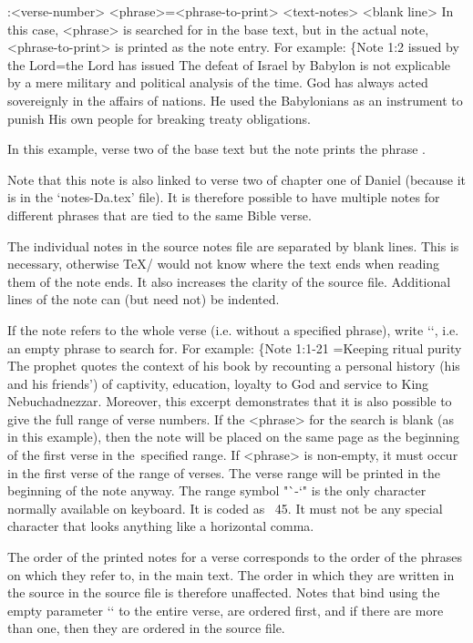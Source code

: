 {{{{{\begtt
{}:<verse-number> {<phrase>}={<phrase-to-print>} <text-notes>
<blank line>
\endtt
In this case, <phrase> is searched for in the base text, but in the actual
note, <phrase-to-print> is printed as the note entry. For example:
\begtt
\{Note 1:2 {issued by the Lord}={the Lord has issued} The defeat of Israel by Babylon is not explicable
   by a mere military and political analysis of the time. God has always acted sovereignly 
   in the affairs of nations. He used the Babylonians as an instrument to punish His own
   people for breaking treaty obligations.

\endtt
In this example, verse two of the base text  
but the note prints the phrase .

Note that this note is also linked to verse two of chapter one
of Daniel (because it is in the `notes-Da.tex' file). It is therefore possible to have multiple
notes for different phrases that are tied to the same Bible verse. 

The individual notes in the source notes file are separated by blank
lines. This is necessary, otherwise \TeX/ would not know where the text ends when reading them
of the note ends. It also increases the clarity of the source file. Additional lines
of the note can (but need not) be indented. 


If the note refers to the whole verse (i.e. without a specified phrase), write
`{}`, i.e. an empty phrase to search for. For example:
\begtt
\{Note 1:1-21 {}={Keeping ritual purity} The prophet quotes the context of his book
   by recounting a personal history (his and his friends') of captivity, education, loyalty to God
   and service to King Nebuchadnezzar.
\endtt
Moreover, this excerpt demonstrates that it is also possible to give the full range of verse numbers.
If the <phrase> for the search is blank (as in this example), then the note
will be placed on the same page as the beginning of the first verse in the~specified range.
If <phrase> is non-empty, it must occur in the first verse of the
range of verses. The verse range will be printed in the beginning of the note anyway.
The range symbol "`-`" is the only  character normally available on
keyboard. It is coded as ~45. It must not be any special character that looks anything like
a horizontal comma.

The order of the printed notes for a verse corresponds to the order of the phrases on which
they refer to, in the main text. The order in which they are written in the source
in the source file is therefore unaffected. Notes that bind using the empty parameter `{}` to the entire
verse, are ordered first, and if there are more than one, then they are ordered
in the source file.


}}}}}
